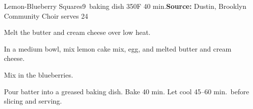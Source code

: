 \begin{recipe}{Lemon-Blueberry Squares}{9\inch{}\inch\ baking dish \hfill 350\0F \hfill 40 min.}{\textbf{Source:} Dustin, Brooklyn Community Choir \hfill serves 24}

 Melt the butter and cream cheese over low heat.

 In a medium bowl, mix lemon cake mix, egg, and melted butter and cream cheese.

 Mix in the blueberries.

 \newstep Pour batter into a greased baking dish. Bake 40 min. Let cool 45--60 min.\ before slicing and serving.
\end{recipe}
